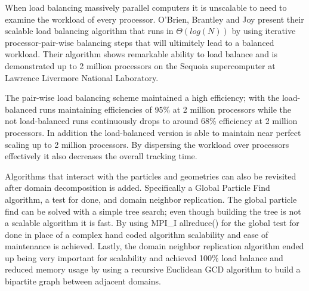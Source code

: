 %
When load balancing massively parallel computers it is unscalable to need to examine the workload of every processor.
%
O'Brien, Brantley and Joy present their scalable load balancing algorithm that runs in $\Theta ( log ( N ) )$ by using iterative processor-pair-wise balancing steps that will ultimitely lead to a balanced workload.
%
Their algorithm shows remarkable ability to load balance and is demonstrated up to 2 million processors on the Sequoia supercomputer at Lawrence Livermore National Laboratory.
~\cite{o2013scalable}
%

%
The pair-wise load balancing scheme maintained a high efficiency; with the load-balanced runs maintaining efficiencies of 95\% at 2 million processors while the not load-balanced runs continuously drops to around 68\% efficiency at 2 million processors.
%
In addition the load-balanced version is able to maintain near perfect scaling up to 2 million processors.
%
By dispersing the workload over processors effectively it also decreases the overall tracking time.
~\cite{o2013scalable}
%

Algorithms that interact with the particles and geometries can also be revisited after domain decomposition is added.
%
Specifically a Global Particle Find algorithm, a test for done, and domain neighbor replication.
%
The global particle find can be solved with a simple tree search; even though building the tree is not a scalable algorithm it is fast.
%
By using MPI\_I allreduce() for the global test for done in place of a complex hand coded algorithm scalability and ease of maintenance is achieved.
%
Lastly, the domain neighbor replication algorithm ended up being very important for scalability and achieved 100\% load balance and reduced memory usage by using a recursive Euclidean GCD algorithm to build a bipartite graph between adjacent domains. ~\cite{o2015particle}
%


